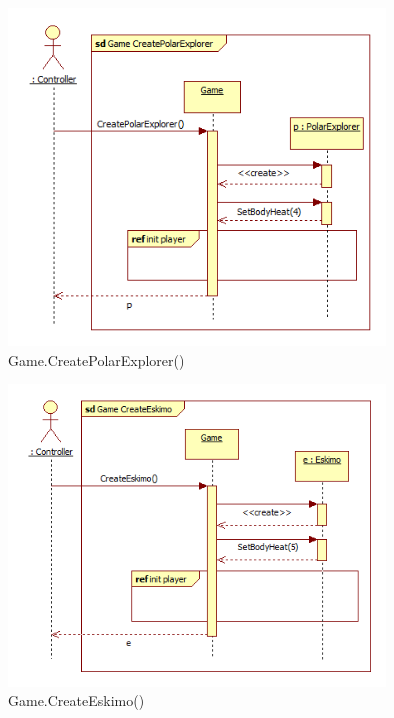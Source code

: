 \begin{figure}[H]
	\begin{center}
		\includegraphics[width=10cm]{chapters/chapter03/seqdiag/Game_CreatePolarExplorer.png}
		\caption{Game.CreatePolarExplorer()}
		\label{fig:GameCreatePolarExplorer}
	\end{center}
\end{figure}
\begin{figure}[H]
	\begin{center}
		\includegraphics[width=10cm]{chapters/chapter03/seqdiag/Game_CreateEskimo.png}
		\caption{Game.CreateEskimo()}
		\label{fig:GameCreateEskimo}
	\end{center}
\end{figure}
